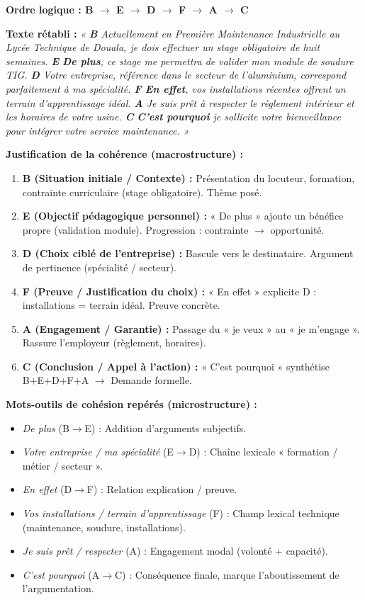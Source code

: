 \documentclass[11pt]{article}
\begin{document}
\begin{corrige}
\textbf{Ordre logique : B $\rightarrow$ E $\rightarrow$ D $\rightarrow$ F $\rightarrow$ A $\rightarrow$ C}

\textbf{Texte rétabli :}
\emph{« \textbf{B} Actuellement en Première Maintenance Industrielle au Lycée Technique de Douala, je dois effectuer un stage obligatoire de huit semaines. \textbf{E} \textbf{De plus}, ce stage me permettra de valider mon module de soudure TIG. \textbf{D} Votre entreprise, référence dans le secteur de l'aluminium, correspond parfaitement à ma spécialité. \textbf{F} \textbf{En effet}, vos installations récentes offrent un terrain d'apprentissage idéal. \textbf{A} Je suis prêt à respecter le règlement intérieur et les horaires de votre usine. \textbf{C} \textbf{C'est pourquoi} je sollicite votre bienveillance pour intégrer votre service maintenance. »}

\textbf{Justification de la cohérence (macrostructure) :}
\begin{enumerate}
    \item \textbf{B (Situation initiale / Contexte) :} Présentation du locuteur, formation, contrainte curriculaire (stage obligatoire). Thème posé.
    \item \textbf{E (Objectif pédagogique personnel) :} « De plus » ajoute un bénéfice propre (validation module). Progression : contrainte $\rightarrow$ opportunité.
    \item \textbf{D (Choix ciblé de l'entreprise) :} Bascule vers le destinataire. Argument de pertinence (spécialité / secteur).
    \item \textbf{F (Preuve / Justification du choix) :} « En effet » explicite D : installations = terrain idéal. Preuve concrète.
    \item \textbf{A (Engagement / Garantie) :} Passage du « je veux » au « je m'engage ». Rassure l'employeur (règlement, horaires).
    \item \textbf{C (Conclusion / Appel à l'action) :} « C'est pourquoi » synthétise B+E+D+F+A $\rightarrow$ Demande formelle.
\end{enumerate}

\textbf{Mots-outils de cohésion repérés (microstructure) :}
\begin{itemize}
    \item \emph{De plus} (B$\rightarrow$E) : Addition d'arguments subjectifs.
    \item \emph{Votre entreprise / ma spécialité} (E$\rightarrow$D) : Chaîne lexicale « formation / métier / secteur ».
    \item \emph{En effet} (D$\rightarrow$F) : Relation explication / preuve.
    \item \emph{Vos installations / terrain d'apprentissage} (F) : Champ lexical technique (maintenance, soudure, installations).
    \item \emph{Je suis prêt / respecter} (A) : Engagement modal (volonté + capacité).
    \item \emph{C'est pourquoi} (A$\rightarrow$C) : Conséquence finale, marque l'aboutissement de l'argumentation.
\end{itemize}


\end{corrige}
\end{document}
